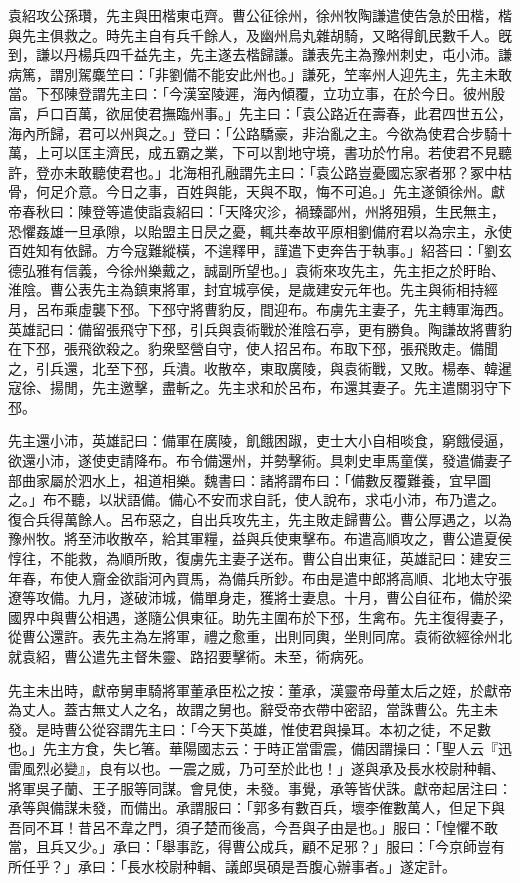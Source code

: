 \begin{pinyinscope}
袁紹攻公孫瓚，先主與田楷東屯齊。曹公征徐州，徐州牧陶謙遣使告急於田楷，楷與先主俱救之。時先主自有兵千餘人，及幽州烏丸雜胡騎，又略得飢民數千人。旣到，謙以丹楊兵四千益先主，先主遂去楷歸謙。謙表先主為豫州刺史，屯小沛。謙病篤，謂別駕麋笁曰：「非劉備不能安此州也。」謙死，笁率州人迎先主，先主未敢當。下邳陳登謂先主曰：「今漢室陵遲，海內傾覆，立功立事，在於今日。彼州殷富，戶口百萬，欲屈使君撫臨州事。」先主曰：「袁公路近在壽春，此君四世五公，海內所歸，君可以州與之。」登曰：「公路驕豪，非治亂之主。今欲為使君合步騎十萬，上可以匡主濟民，成五霸之業，下可以割地守境，書功於竹帛。若使君不見聽許，登亦未敢聽使君也。」北海相孔融謂先主曰：「袁公路豈憂國忘家者邪？冢中枯骨，何足介意。今日之事，百姓與能，天與不取，悔不可追。」先主遂領徐州。獻帝春秋曰：陳登等遣使詣袁紹曰：「天降灾沴，禍臻鄙州，州將殂殞，生民無主，恐懼姦雄一旦承隙，以貽盟主日昃之憂，輒共奉故平原相劉備府君以為宗主，永使百姓知有依歸。方今寇難縱橫，不遑釋甲，謹遣下吏奔告于執事。」紹荅曰：「劉玄德弘雅有信義，今徐州樂戴之，誠副所望也。」袁術來攻先主，先主拒之於盱眙、淮陰。曹公表先主為鎮東將軍，封宜城亭侯，是歲建安元年也。先主與術相持經月，呂布乘虛襲下邳。下邳守將曹豹反，間迎布。布虜先主妻子，先主轉軍海西。英雄記曰：備留張飛守下邳，引兵與袁術戰於淮陰石亭，更有勝負。陶謙故將曹豹在下邳，張飛欲殺之。豹衆堅營自守，使人招呂布。布取下邳，張飛敗走。備聞之，引兵還，北至下邳，兵潰。收散卒，東取廣陵，與袁術戰，又敗。楊奉、韓暹寇徐、揚閒，先主邀擊，盡斬之。先主求和於呂布，布還其妻子。先主遣關羽守下邳。

先主還小沛，英雄記曰：備軍在廣陵，飢餓困踧，吏士大小自相啖食，窮餓侵逼，欲還小沛，遂使吏請降布。布令備還州，并勢擊術。具刺史車馬童僕，發遣備妻子部曲家屬於泗水上，祖道相樂。魏書曰：諸將謂布曰：「備數反覆難養，宜早圖之。」布不聽，以狀語備。備心不安而求自託，使人說布，求屯小沛，布乃遣之。復合兵得萬餘人。呂布惡之，自出兵攻先主，先主敗走歸曹公。曹公厚遇之，以為豫州牧。將至沛收散卒，給其軍糧，益與兵使東擊布。布遣高順攻之，曹公遣夏侯惇往，不能救，為順所敗，復虜先主妻子送布。曹公自出東征，英雄記曰：建安三年春，布使人齎金欲詣河內買馬，為備兵所鈔。布由是遣中郎將高順、北地太守張遼等攻備。九月，遂破沛城，備單身走，獲將士妻息。十月，曹公自征布，備於梁國界中與曹公相遇，遂隨公俱東征。助先主圍布於下邳，生禽布。先主復得妻子，從曹公還許。表先主為左將軍，禮之愈重，出則同輿，坐則同席。袁術欲經徐州北就袁紹，曹公遣先主督朱靈、路招要擊術。未至，術病死。

先主未出時，獻帝舅車騎將軍董承臣松之按：董承，漢靈帝母董太后之姪，於獻帝為丈人。蓋古無丈人之名，故謂之舅也。辭受帝衣帶中密詔，當誅曹公。先主未發。是時曹公從容謂先主曰：「今天下英雄，惟使君與操耳。本初之徒，不足數也。」先主方食，失匕箸。華陽國志云：于時正當雷震，備因謂操曰：「聖人云『迅雷風烈必變』，良有以也。一震之威，乃可至於此也！」遂與承及長水校尉种輯、將軍吳子蘭、王子服等同謀。會見使，未發。事覺，承等皆伏誅。獻帝起居注曰：承等與備謀未發，而備出。承謂服曰：「郭多有數百兵，壞李傕數萬人，但足下與吾同不耳！昔呂不韋之門，須子楚而後高，今吾與子由是也。」服曰：「惶懼不敢當，且兵又少。」承曰：「舉事訖，得曹公成兵，顧不足邪？」服曰：「今京師豈有所任乎？」承曰：「長水校尉种輯、議郎吳碩是吾腹心辦事者。」遂定計。


\end{pinyinscope}
